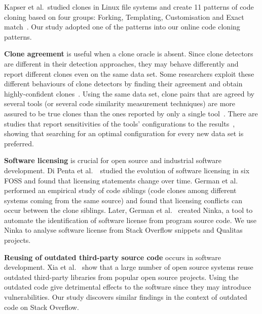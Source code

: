 \documentclass[sigconf,review, anonymous]{acmart}
\begin{document}
Kapser et al.~studied clones in Linux file systems and create 11 patterns of code cloning based on four groups: Forking, Templating, Customisation and Exact match~\cite{Kapser2003,Kapser2008}. Our study adopted one of the patterns into our online code cloning patterns.

\textbf{Clone agreement} is useful when a clone oracle is absent. Since clone detectors are different in their detection approaches, they may behave differently and report different clones even on the same data set. Some researchers exploit these different behaviours of clone detectors by finding their agreement and obtain highly-confident clones~\cite{Bellon2007,Wang2013}. Using the same data set, clone pairs that are agreed by several tools (or several code similarity measurement techniques) are more assured to be true clones than the ones reported by only a single tool~\cite{Wang2013,cr2016ssbse,Funaro2010}. There are studies that report sensitivities of the tools' configurations to the results~\cite{Wang2013,cr2016ssbse}, showing that searching for an optimal configuration for every new data set is preferred.

\textbf{Software licensing} is crucial for open source and industrial software development. Di Penta et al.~\cite{DiPenta2010}~studied the evolution of software licensing in six FOSS and found that licensing statements change over time. German et al.~\cite{German2009} performed an empirical study of code siblings (code clones among different systems coming from the same source) and found that licensing conflicts can occur between the clone siblings. Later, German et al.~\cite{German2010} created Ninka, a tool to automate the identification of software license from program source code. We use Ninka to analyse software license from Stack Overflow snippets and Qualitas projects. 

\textbf{Reusing of outdated third-party source code} occurs in software development. Xia et al.~\cite{Xia2014} show that a large number of open source systems reuse outdated third-party libraries from popular open source projects. Using the outdated code give detrimental effects to the software since they may introduce vulnerabilities. Our study discovers similar findings in the context of outdated code on Stack Overflow.
\end{document}
